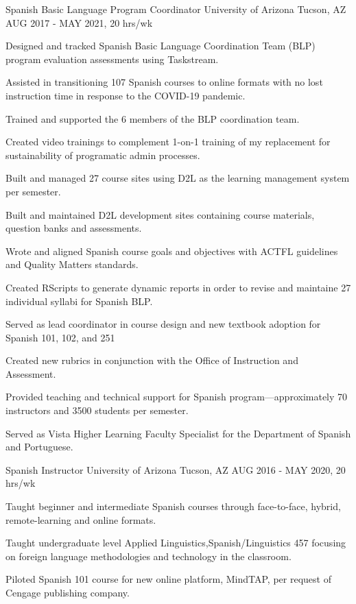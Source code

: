 \begin{cventries}

\cventry
{Spanish Basic Language Program Coordinator} %
{University of Arizona} %
{Tucson, AZ} %
{AUG 2017 - MAY 2021, 20 hrs/wk} %
{ %
\begin{cvitems}
\item {Designed and tracked Spanish Basic Language Coordination Team (BLP) program evaluation assessments using Taskstream.}
\item {Assisted in transitioning 107 Spanish courses to online formats with no lost instruction time in response to the COVID-19 pandemic.}
\item {Trained and supported the 6 members of the BLP coordination team.}
\item {Created video trainings to complement 1-on-1 training of my replacement for sustainability of programatic admin processes.}
\item {Built and managed 27 course sites using D2L as the learning management system per semester.}
\item {Built and maintained D2L development sites containing course materials, question banks and assessments.}
\item {Wrote and aligned Spanish course goals and objectives with ACTFL guidelines and Quality Matters standards.}
\item {Created RScripts to generate dynamic reports in order to revise and maintaine 27 individual syllabi for Spanish BLP.}
\item {Served as lead coordinator in course design and new textbook adoption for Spanish 101, 102, and 251}
\item {Created new rubrics in conjunction with the Office of Instruction and Assessment.}
\item {Provided teaching and technical support for Spanish program---approximately 70 instructors and 3500 students per semester.}
\item {Served as Vista Higher Learning Faculty Specialist for the Department of Spanish and Portuguese.}
\end{cvitems}
}


\cventry
{Spanish Instructor} %
{University of Arizona} %
{Tucson, AZ} %
{AUG 2016 - MAY 2020, 20 hrs/wk} %
{ %
\begin{cvitems}
\item {Taught beginner and intermediate Spanish courses through face-to-face, hybrid, remote-learning and online formats.}
\item {Taught undergraduate level Applied Linguistics,Spanish/Linguistics 457 focusing on foreign language methodologies and technology in the classroom.} 
\item {Piloted Spanish 101 course for new online platform, MindTAP, per request of Cengage publishing company.}
\end{cvitems}
}


\end{cventries}
